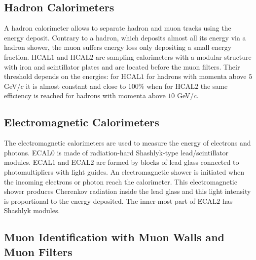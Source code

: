 \subsection{Hadron Calorimeters}

A hadron calorimeter allows to separate hadron and muon tracks using the energy deposit. Contrary to a hadron, which deposits almost all its energy via a hadron shower, the muon suffers energy loss only depositing a small energy fraction. HCAL$1$ and HCAL$2$ are sampling calorimeters with a modular structure with iron and scintillator plates and are located before the muon filters. Their threshold depends on the energies: for HCAL$1$ for hadrons with momenta above $5$ GeV/$c$ it is almost constant and close to $100$\% when for HCAL$2$ the same efficiency is reached for hadrons with momenta above $10$ GeV/$c$.

\subsection{Electromagnetic Calorimeters}

The electromagnetic calorimeters are used to measure the energy of electrons and photons. ECAL$0$ is made of radiation-hard Shashlyk-type lead/scintillator modules. ECAL$1$ and ECAL$2$ are formed by blocks of lead glass connected to photomultipliers with light guides. An electromagnetic shower is initiated when the incoming electrons or photon reach the calorimeter. This electromagnetic shower produces Cherenkov radiation inside the lead glass and this light intensity is proportional to the energy deposited. The inner-most part of ECAL$2$ has Shashlyk modules.

\subsection{Muon Identification with Muon Walls and Muon Filters}

